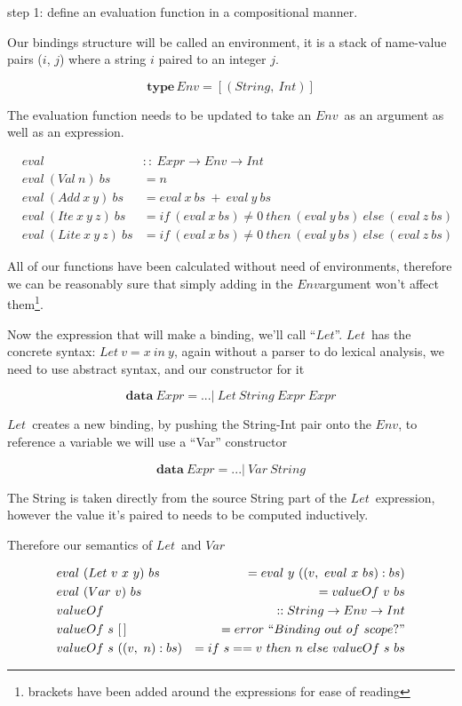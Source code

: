 \documentclass {article}
\begin{document}
step 1: define an evaluation 
	function in a compositional manner.

Our bindings structure will be called
an environment, it is a stack
of name-value pairs ($i$, $j$) where
a string $i$ paired to an integer $j$.
\newcommand{\env}{$Env$}

	\[ \textbf{type} \, Env = [(String,\ Int)]\]

The evaluation function needs to be updated
to take an \env\ as an argument as well as
an expression.

\begin{eqnarray*}
	&eval              	   		&::\  Expr \rightarrow Env \rightarrow Int \\
	&eval\ (Val\ n)\ bs 		&=   n \\
	&eval\ (Add\ x\ y)\ bs		&=   eval\ x\ bs\ +\ eval\ y\ bs \\
	&eval\ (Ite\ x\ y\ z)\ bs	&=   if\ (eval\ x\ bs) \not= 0\ then\ (eval\ y\ bs)\ else\ (eval\ z\ bs) \\
	&eval\ (Lite\ x\ y\ z)\ bs 	&=   if\ (eval\ x\ bs) \not= 0\ then\ (eval\ y\ bs)\ else\ (eval\ z\ bs)
\end{eqnarray*}

All of our functions
have been calculated without need of environments,
therefore we can be reasonably sure that simply adding in the
\env argument won't affect them\footnote{
brackets have been added around the expressions for ease of reading}.

\newcommand{\lets}{$Let$}
\newcommand{\var}{$Var$}

Now the expression that will make a binding,
we'll call ``\lets''.
\lets\ has the concrete syntax:
\( Let\ v = x\ in\ y\),
again without a parser to do
lexical analysis, we need to use
abstract syntax, and our constructor
for it

	\[ \textbf{data}\ Expr = ... |\ Let\ String\ Expr\ Expr \]

\lets\ creates a new binding,
by pushing the String-Int pair
onto the \env, to reference a variable we will
use a ``Var'' constructor

\[ \textbf{data}\ Expr = ... |\ Var\ String \]

The String is taken directly from the source
String part of the \lets\ expression,
however the value it's paired to 
needs to be computed inductively.

Therefore our semantics of \lets\ and \var\

\begin{eqnarray*}
&eval\ (Let\ v\ x\ y)\ bs &= eval\ y\ ((v,\ eval\ x\ bs):bs) \\
&eval\ (Var\ v)\ bs		    &=   valueOf\ v\ bs  \\
&valueOf\ &:: String \rightarrow Env \rightarrow Int \\
&valueOf\ s\ [\, ]\ &= error\ ``Binding\ out\ of\ scope?" \\
&valueOf\ s\ ((v,\ n):bs) &= if\ s == v\ then\ n\ else\ valueOf\ s\ bs
\end{eqnarray*}
\end{document}
